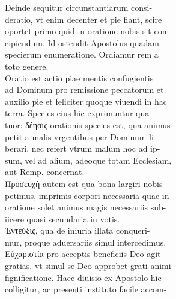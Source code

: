 \documentclass{article}
\begin{document}
\begin{pages}
                Deinde sequitur circunstantiarum consi- \\
                deratio, vt enim decenter et pie fiant, scire \\
                oportet primo quid in oratione nobis sit con- \\
                cipiendum. Id ostendit Apostolus quadam \\
                specierum enumeratione. Ordiamur rem a \\
                toto genere. \\
                Oratio est actio piae mentis confugientis \\
                ad Dominum pro remissione peccatorum et \\
                auxilio pie et feliciter quoque viuendi in hac \\
                terra. Species eius hic exprimuntur qua- \\
                tuor: δέησις orationis species est, qua animus \\
                petit a malis vrgentibus per Dominum li- \\
                berari, nec refert vtrum malum hoc ad ip- \\
                sum, vel ad alium, adeoque totam Ecclesiam, \\
                aut Remp. concernat. \\
                Προσευχὴ autem est qua bona largiri nobis \\
                petimus, imprimis corpori necessaria quae in \\
                oratione solet animus magis necessariis sub- \\
                iicere quasi secundaria in votis. \\
                Ἐντεύξις, qua de iniuria illata conqueri- \\
                mur, proque aduersariis simul intercedimus. \\
                Εὐχαριστία pro acceptis beneficiis Deo agit \\
                gratias, vt simul se Deo approbet grati animi \\
                fignificatione. Haec diuisio ex Apostolo hic \\
                colligitur, ac presenti instituto facile accom- \\

\end{pages}
\end{document}
